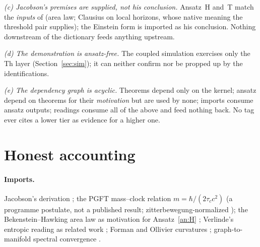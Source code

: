 \documentclass[10pt,twocolumn]{article}
\theoremstyle{definition}
\begin{document}
\emph{(c) Jacobson's premises are supplied, not his conclusion.} Ansatz~H and~T
match the \emph{inputs} of \cite{jacobson} (area law; Clausius on local horizons,
whose native meaning the threshold pair supplies); the Einstein form is imported as
his conclusion. Nothing downstream of the dictionary feeds anything upstream.

\emph{(d) The demonstration is ansatz-free.} The coupled simulation exercises only
the Th layer (Section~\ref{sec:sim}); it can neither confirm nor be propped up by
the identifications.

\emph{(e) The dependency graph is acyclic.} Theorems depend only on the kernel;
ansatz depend on theorems for their \emph{motivation} but are used by none;
imports consume ansatz outputs; readings consume all of the above and feed nothing
back. No tag ever cites a lower tier as evidence for a higher one.

\section{Honest accounting}\label{sec:open}

\paragraph{Imports.} Jacobson's derivation \cite{jacobson}; the PGFT mass--clock relation $m=\hbar/(2\tau_c c^2)$ (a programme postulate,
not a published result; zitterbewegung-normalized \cite{schrodinger,hestenes}); the Bekenstein--Hawking area law as motivation for
Ansatz~\ref{an:H} \cite{bekenstein,hawking}; Verlinde's entropic reading as related
work \cite{verlinde}; Forman and Ollivier curvatures \cite{forman,ollivier};
graph-to-manifold spectral convergence \cite{bik}.
\end{document}
